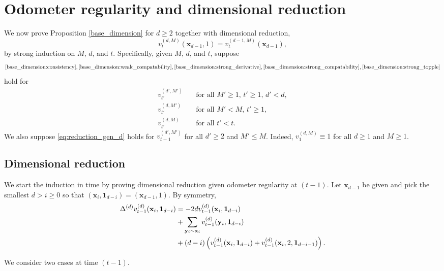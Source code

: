 \documentclass[12pt]{amsart}
\begin{document}
	
	\section{Odometer regularity and dimensional reduction} \label{sec:dim_reduction}
	We now prove Proposition \ref{base_dimension} for $d \geq 2$ together with dimensional reduction,
	\begin{equation} \label{eq:reduction_gen_d}
	v_t^{(d,M)}(\mathbf{x}_{d-1},1) = v_{t}^{(d-1,M)}(\mathbf{x}_{d-1}),
	\end{equation}
	 by strong induction on $M$, $d$, and $t$. Specifically, given $M$, $d$, and $t$, suppose
	 \[ \eqref{base_dimension:consistency},\eqref{base_dimension:weak_compatability},\eqref{base_dimension:strong_derivative},\eqref{base_dimension:strong_compatability}, \eqref{base_dimension:strong_topple}
	 \]
	 hold for
	\begin{align*}
	v_{t'}^{(d', M')} &\quad \mbox{for all $M' \geq 1$, $t' \geq 1$, $d' < d$}, \\
	v_{t'}^{(d, M')} &\quad \mbox{for all $M' < M$, $t' \geq 1$}, \\
	v_{t'}^{(d, M)} &\quad \mbox{for all $t' < t$}.
	\end{align*}
	We also suppose  \eqref{eq:reduction_gen_d} holds for $v_{t-1}^{(d',M')}$ for all $d' \geq 2$ and $M' \leq M$.
	Indeed, $v_{1}^{(d,M)} \equiv 1$ for all $d \geq 1$ and $M \geq 1$.

	\subsection{Dimensional reduction}
	We start the induction in time by proving dimensional reduction given odometer regularity at $(t-1)$. 
	Let $\mathbf{x}_{d-1}$ be given and pick the smallest $d > i \geq 0$ so that
	$(\mathbf{x}_i, \mathbf{1}_{d-i}) = (\mathbf{x}_{d-1},1)$. 
	By symmetry, 
	\begin{align}
	\notag  \Delta^{(d)} v_{t-1}^{(d)}(\mathbf{x}_{i}, \mathbf{1}_{d-i}) &= -2 d v_{t-1}^{(d)}(\mathbf{x}_{i}, \mathbf{1}_{d-i}) \\  
	\notag  &+  \sum_{\mathbf{y}_{i} \sim \mathbf{x}_{i}} v_{t-1}^{(d)}(\mathbf{y}_{i}, \mathbf{1}_{d-i}) \\
	\notag  &+ (d-i) \left( v_{t-1}^{(d)}(\mathbf{x}_{i}, \mathbf{1}_{d-i})   + v_{t-1}^{(d)}(\mathbf{x}_{i},2, \mathbf{1}_{d-i-1})  \right).
	\end{align}
	
	We consider two cases at time $(t-1)$. 
	
\end{document}
